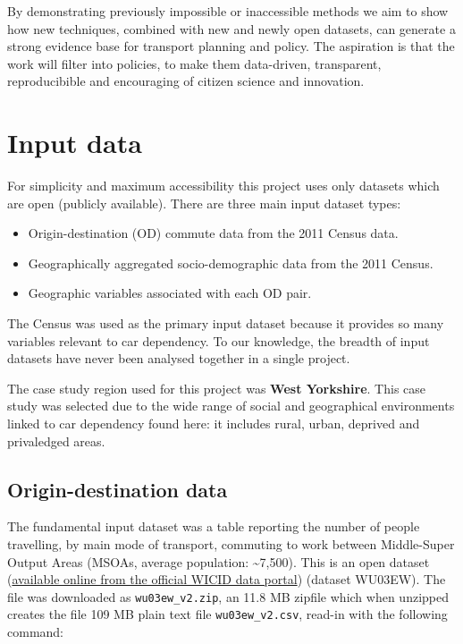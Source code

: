 \documentclass[11pt]{article}
\providecommand{\tightlist}{%
  \setlength{\itemsep}{0pt}\setlength{\parskip}{0pt}}
\begin{document}
By demonstrating previously impossible or inaccessible methods we aim to
show how new techniques, combined with new and newly open datasets, can
generate a strong evidence base for transport planning and policy. The
aspiration is that the work will filter into policies, to make them
data-driven, transparent, reproducibible and encouraging of citizen
science and innovation.

\section{Input data}\label{input-data}

For simplicity and maximum accessibility this project uses only datasets
which are open (publicly available). There are three main input dataset
types:

\begin{itemize}
\tightlist
\item
  Origin-destination (OD) commute data from the 2011 Census data.
\item
  Geographically aggregated socio-demographic data from the 2011 Census.
\item
  Geographic variables associated with each OD pair.
\end{itemize}

The Census was used as the primary input dataset because it provides so
many variables relevant to car dependency. To our knowledge, the breadth
of input datasets have never been analysed together in a single project.

The case study region used for this project was \textbf{West Yorkshire}.
This case study was selected due to the wide range of social and
geographical environments linked to car dependency found here: it
includes rural, urban, deprived and privaledged areas.

\subsection{Origin-destination data}\label{origin-destination-data}

The fundamental input dataset was a table reporting the number of people
travelling, by main mode of transport, commuting to work between
Middle-Super Output Areas (MSOAs, average population:
\textasciitilde{}7,500). This is an open dataset
(\href{http://wicid.ukdataservice.ac.uk/}{available online from the
official WICID data portal}) (dataset WU03EW). The file was downloaded
as \texttt{wu03ew\_v2.zip}, an 11.8 MB zipfile which when unzipped
creates the file 109 MB plain text file \texttt{wu03ew\_v2.csv}, read-in
with the following command:
\end{document}
